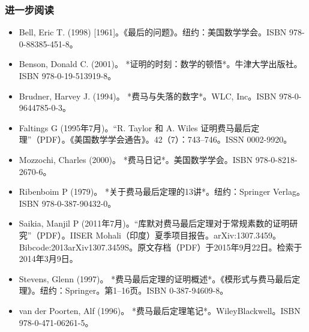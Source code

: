 \subsubsection{进一步阅读} 
\begin{itemize}
\item Bell, Eric T. (1998) [1961]。《最后的问题》。纽约：美国数学学会。ISBN 978-0-88385-451-8。  
\item Benson, Donald C. (2001)。 *证明的时刻：数学的顿悟*。牛津大学出版社。ISBN 978-0-19-513919-8。  
\item Brudner, Harvey J. (1994)。 *费马与失落的数字*。WLC, Inc。ISBN 978-0-9644785-0-3。  
\item Faltings G (1995年7月)。“R. Taylor 和 A. Wiles 证明费马最后定理”（PDF）。《美国数学学会通告》。42（7）：743–746。ISSN 0002-9920。  
\item Mozzochi, Charles (2000)。 *费马日记*。美国数学学会。ISBN 978-0-8218-2670-6。  
\item Ribenboim P (1979)。 *关于费马最后定理的13讲*。纽约：Springer Verlag。ISBN 978-0-387-90432-0。  
\item Saikia, Manjil P (2011年7月)。“库默对费马最后定理对于常规素数的证明研究”（PDF）。IISER Mohali（印度）夏季项目报告。arXiv:1307.3459。Bibcode:2013arXiv1307.3459S。原文存档（PDF）于2015年9月22日。检索于2014年3月9日。  
\item Stevens, Glenn (1997)。 *费马最后定理的证明概述*。《模形式与费马最后定理》。纽约：Springer。第1–16页。ISBN 0-387-94609-8。  
\item van der Poorten, Alf (1996)。 *费马最后定理笔记*。WileyBlackwell。ISBN 978-0-471-06261-5。
\end{itemize}
